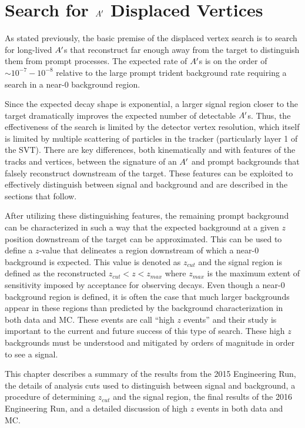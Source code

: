 \chapter{Search for $A^\prime$ Displaced Vertices}\label{chap:aprimes}

As stated previously, the basic premise of the displaced vertex search is to search for long-lived $A^\prime$s that reconstruct far enough away from the target to distinguish them from prompt processes. The expected rate of $A^\prime$s is on the order of $\sim 10^{-7} - 10^{-8}$ relative to the large prompt trident background rate requiring a search in a near-0 background region.

Since the expected decay shape is exponential, a larger signal region closer to the target dramatically improves the expected number of detectable $A^\prime$s. Thus, the effectiveness of the search is limited by the detector vertex resolution, which itself is limited by multiple scattering of particles in the tracker (particularly layer 1 of the SVT). There are key differences, both kinematically and with features of the tracks and vertices, between the signature of an $A^\prime$ and prompt backgrounds that falsely reconstruct downstream of the target. These features can be exploited to effectively distinguish between signal and background and are described in the sections that follow.

After utilizing these distinguishing features, the remaining prompt background can be characterized in such a way that the expected background at a given $z$ position downstream of the target can be approximated. This can be used to define a $z$-value that delineates a region downstream of which a near-0 background is expected. This value is denoted as $z_{cut}$ and the signal region is defined as the reconstructed $z_{cut}<z<z_{max}$ where $z_{max}$ is the maximum extent of sensitivity imposed by acceptance for observing decays. Even though a near-0 background region is defined, it is often the case that much larger backgrounds appear in these regions than predicted by the background characterization in both data and MC. These events are call ``high $z$ events'' and their study is important to the current and future success of this type of search. These high $z$ backgrounds must be understood and mitigated by orders of magnitude in order to see a signal.

This chapter describes a summary of the results from the 2015 Engineering Run, the details of analysis cuts used to distinguish between signal and background, a procedure of determining $z_{cut}$ and the signal region, the final results of the 2016 Engineering Run, and a detailed discussion of high $z$ events in both data and MC.

